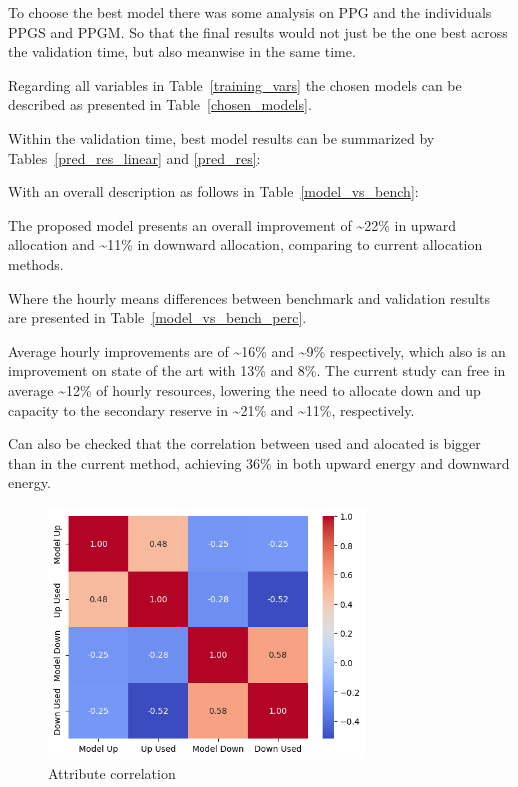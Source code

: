 To choose the best model there was some analysis on \gls{PPG} and the individuals \gls{PPGS} and \gls{PPGM}. So that the final results would not just be the one best across the validation time, but also meanwise in the same time.\par
Regarding all variables in Table~\ref{training_vars} the chosen models can be described as presented in Table~\ref{chosen_models}.

Within the validation time, best model results can be summarized by Tables~\ref{pred_res_linear} and \ref{pred_res}:



With an overall description as follows in Table~\ref{model_vs_bench}:


The proposed model presents an overall improvement of \textasciitilde22\% in upward allocation and \textasciitilde11\% in downward allocation, comparing to current allocation methods.\par
Where the hourly means differences between benchmark and validation results are presented in Table~\ref{model_vs_bench_perc}.



Average hourly improvements are of \textasciitilde16\% and \textasciitilde9\% respectively, which also is an improvement on state of the art \cite{Algarvio2024} with 13\% and 8\%.
The current study can free in average \textasciitilde12\% of hourly resources, lowering the need to allocate down and up capacity to the secondary reserve in \textasciitilde21\% and \textasciitilde11\%, respectively.\par

Can also be checked that the correlation between used and alocated is bigger than in the current method, achieving 36\% in both upward energy and downward energy. \par

\begin{figure}[H]
    \centering
    \includegraphics[width=0.75\textwidth]{plots/heatmap_correlation_pred.png}
    \caption{Attribute correlation}
    \label{fig:Attribute_correlation}
  \end{figure}



